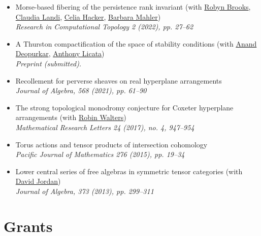 \documentclass[a4paper]{moderncv}
\begin{document}
\begin{itemize}
\emph{Preprint.}
\item Morse-based fibering of the persistence rank invariant (with \href{https://sites.google.com/view/robynkayebrooks/home}{Robyn Brooks}, \href{http://personale.unimore.it/Rubrica/Dettaglio/clandi}{Claudia Landi}, \href{https://people.epfl.ch/celia.hacker/?lang=en}{Celia Hacker}, \href{https://www.maths.ox.ac.uk/people/barbara.mahler}{Barbara Mahler})\\
\emph{Research in Computational Topology 2 (2022), pp. 27--62}
\item A Thurston compactification of the space of stability conditions (with \href{https://deopurkar.github.io}{Anand Deopurkar}, \href{https://maths-people.anu.edu.au/\~licatat/Home.html}{Anthony Licata})\\
\emph{Preprint (submitted).}
\item Recollement for perverse sheaves on real hyperplane arrangements\\
\emph{Journal of Algebra, 568 (2021), pp. 61--90}
\item The strong topological monodromy conjecture for Coxeter hyperplane arrangements (with \href{http://www.robinwalters.com/}{Robin Walters})\\
\emph{Mathematical Research Letters 24 (2017), no. 4, 947--954}
\item Torus actions and tensor products of intersection cohomology\\
\emph{Pacific Journal of Mathematics 276 (2015), pp. 19--34}
\item Lower central series of free algebras in symmetric tensor categories (with \href{http://www.maths.ed.ac.uk/\~djordan/}{David Jordan})\\
\emph{Journal of Algebra, 373 (2013), pp. 299--311}
\end{itemize}

\section*{Grants}
\label{sec:org13d2a32}
\end{document}
